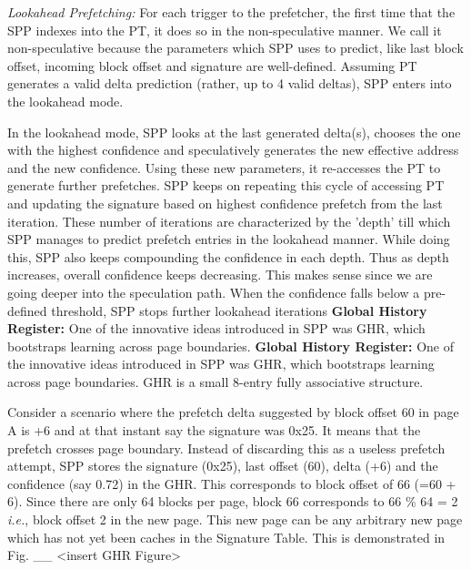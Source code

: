 \documentclass{sig-alternate}
\begin{document}
\textit{Lookahead Prefetching:} For each trigger to the prefetcher, the first time that the SPP indexes into the PT, it does so in the non-speculative manner. 
We call it non-speculative because the parameters which SPP uses to predict, like last block offset, incoming block offset and signature are well-defined. 
Assuming PT generates a valid delta prediction (rather, up to 4 valid deltas), SPP enters into the lookahead mode.

In the lookahead mode, SPP looks at the last generated delta(s), chooses the one with the highest confidence and speculatively generates the new effective address and the new confidence. 
Using these new parameters, it re-accesses the PT to generate further prefetches. 
SPP keeps on repeating this cycle of accessing PT and updating the signature based on highest confidence prefetch from the last iteration. 
These number of iterations are characterized by the 'depth' till which SPP manages to predict prefetch entries in the lookahead manner. 
While doing this, SPP also keeps compounding the confidence in each depth. 
Thus as depth increases, overall confidence keeps decreasing. 
This makes sense since we are going deeper into the speculation path. 
When the confidence falls below a pre-defined threshold, SPP stops further lookahead iterations
\newline
\newline
\textbf{Global History Register:} One of the innovative ideas introduced in SPP was GHR, which bootstraps learning across page boundaries. 
\textbf{Global History Register:} One of the innovative ideas introduced in SPP was GHR, which bootstraps learning across page boundaries. 
GHR is a small 8-entry fully associative structure. 

Consider a scenario where the prefetch delta suggested by block offset 60 in page A is +6 and at that instant say the signature was 0x25. 
It means that the prefetch crosses page boundary. 
Instead of discarding this as a useless prefetch attempt, SPP stores the signature (0x25), last offset (60), delta (+6) and the confidence (say 0.72) in the GHR. 
This corresponds to block offset of 66 (=60 + 6). 
Since there are only 64 blocks per page, block 66 corresponds to 66 \% 64 = 2 \textit{i.e.}, block offset 2 in the new page. 
This new page can be any arbitrary new page which has not yet been caches in the Signature Table.
This is demonstrated in Fig. \_\_ <insert GHR Figure>
\end{document}
